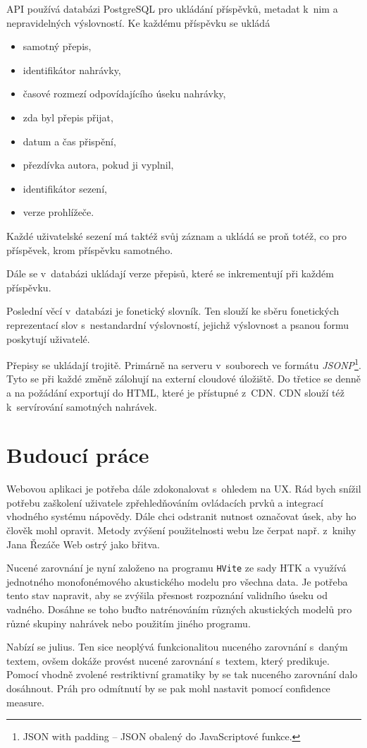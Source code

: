 API používá databázi PostgreSQL pro ukládání příspěvků, metadat k~nim a nepravidelných
výslovností. Ke každému příspěvku se ukládá
\begin{itemize}
\item{samotný přepis,}
\item{identifikátor nahrávky,}
\item{časové rozmezí odpovídajícího úseku nahrávky,}
\item{zda byl přepis přijat,}
\item{datum a čas přispění,}
\item{přezdívka autora, pokud ji vyplnil,}
\item{identifikátor sezení,}
\item{verze prohlížeče.}
\end{itemize}

Každé uživatelské sezení má taktéž svůj záznam a ukládá se proň totéž, co pro
příspěvek, krom příspěvku samotného.

Dále se v~databázi ukládají verze přepisů, které se inkrementují při každém
příspěvku.

Poslední věcí v~databázi je fonetický slovník. Ten slouží ke sběru fonetických
reprezentací slov s~nestandardní výslovností, jejichž výslovnost a psanou formu
poskytují uživatelé.

Přepisy se ukládají trojitě. Primárně na serveru v~souborech ve formátu {\em
JSONP}\footnote{JSON with padding -- JSON obalený do JavaScriptové funkce.}.
Tyto se při každé změně zálohují na externí cloudové úložiště. Do třetice se
denně a na požádání exportují do HTML, které je přístupné z~CDN.
CDN slouží též k~servírování samotných nahrávek.


\section{Budoucí práce}

Webovou aplikaci je potřeba dále zdokonalovat s~ohledem na UX. Rád bych
snížil potřebu zaškolení uživatele zpřehledňováním ovládacích prvků a
integrací vhodného systému nápovědy. Dále chci odstranit nutnost označovat
úsek, aby ho člověk mohl opravit.
Metody zvýšení použitelnosti webu lze čerpat např. z~knihy Jana Řezáče Web
ostrý jako břitva\cite{rezac2016web}.

Nucené zarovnání je nyní založeno na programu \texttt{HVite} ze sady HTK a
využívá jednotného monofonémového akustického modelu pro všechna data. Je
potřeba tento stav napravit, aby se zvýšila přesnost rozpoznání validního úseku
od vadného. Dosáhne se toho buďto natrénováním různých akustických modelů pro
různé skupiny nahrávek nebo použitím jiného programu.

Nabízí se julius. Ten sice neoplývá funkcionalitou nuceného zarovnání s~daným
textem, ovšem dokáže provést nucené zarovnání s~textem, který predikuje. Pomocí
vhodně zvolené restriktivní gramatiky by se tak nuceného zarovnání dalo
dosáhnout. Práh pro odmítnutí by se pak mohl nastavit pomocí confidence measure.

